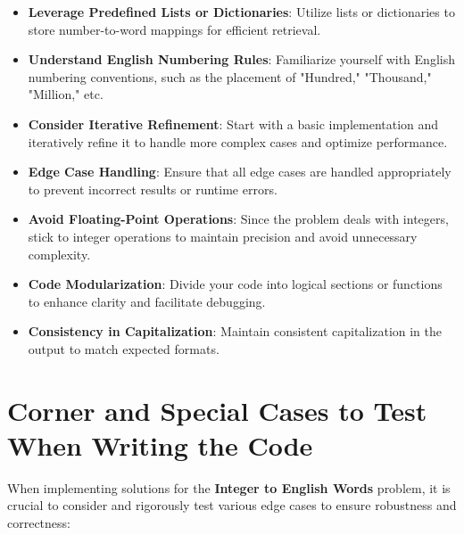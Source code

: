 \begin{itemize}
    \item \textbf{Leverage Predefined Lists or Dictionaries}: Utilize lists or dictionaries to store number-to-word mappings for efficient retrieval.
    
    \item \textbf{Understand English Numbering Rules}: Familiarize yourself with English numbering conventions, such as the placement of "Hundred," "Thousand," "Million," etc.
    
    \item \textbf{Consider Iterative Refinement}: Start with a basic implementation and iteratively refine it to handle more complex cases and optimize performance.
    
    \item \textbf{Edge Case Handling}: Ensure that all edge cases are handled appropriately to prevent incorrect results or runtime errors.
    
    \item \textbf{Avoid Floating-Point Operations}: Since the problem deals with integers, stick to integer operations to maintain precision and avoid unnecessary complexity.
    
    \item \textbf{Code Modularization}: Divide your code into logical sections or functions to enhance clarity and facilitate debugging.
    
    \item \textbf{Consistency in Capitalization}: Maintain consistent capitalization in the output to match expected formats.
\end{itemize}

\section*{Corner and Special Cases to Test When Writing the Code}

When implementing solutions for the \textbf{Integer to English Words} problem, it is crucial to consider and rigorously test various edge cases to ensure robustness and correctness:

